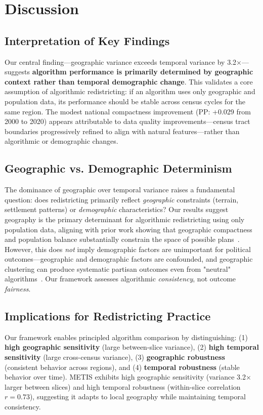 \section{Discussion}
\label{sec:discussion}

\subsection{Interpretation of Key Findings}

Our central finding—geographic variance exceeds temporal variance by 3.2×—suggests \textbf{algorithm performance is primarily determined by geographic context rather than temporal demographic change}. This validates a core assumption of algorithmic redistricting: if an algorithm uses only geographic and population data, its performance should be stable across census cycles for the same region. The modest national compactness improvement (PP: +0.029 from 2000 to 2020) appears attributable to data quality improvements—census tract boundaries progressively refined to align with natural features—rather than algorithmic or demographic changes.

\subsection{Geographic vs. Demographic Determinism}

The dominance of geographic over temporal variance raises a fundamental question: does redistricting primarily reflect \textit{geographic} constraints (terrain, settlement patterns) or \textit{demographic} characteristics? Our results suggest geography is the primary determinant for algorithmic redistricting using only population data, aligning with prior work showing that geographic compactness and population balance substantially constrain the space of possible plans~\cite{deford2021}. However, this does \textit{not} imply demographic factors are unimportant for political outcomes—geographic and demographic factors are confounded, and geographic clustering can produce systematic partisan outcomes even from "neutral" algorithms~\cite{chen2013, rodden2019}. Our framework assesses algorithmic \textit{consistency}, not outcome \textit{fairness}.

\subsection{Implications for Redistricting Practice}

Our framework enables principled algorithm comparison by distinguishing: (1) \textbf{high geographic sensitivity} (large between-slice variance), (2) \textbf{high temporal sensitivity} (large cross-census variance), (3) \textbf{geographic robustness} (consistent behavior across regions), and (4) \textbf{temporal robustness} (stable behavior over time). METIS exhibits high geographic sensitivity (variance 3.2× larger between slices) and high temporal robustness (within-slice correlation $r=0.73$), suggesting it adapts to local geography while maintaining temporal consistency.

